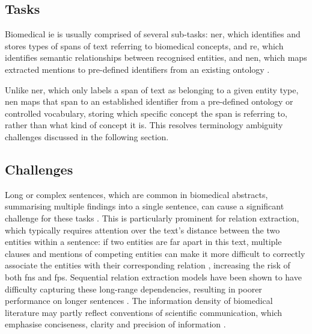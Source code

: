 \subsection{Tasks}
\label{subsec:lit:tasks}
Biomedical \gls{ie} is usually comprised of several sub-tasks: \gls{ner}, which identifies and stores types of spans of text referring to biomedical concepts, and \gls{re}, which identifies semantic relationships between recognised entities, and \gls{nen}, which maps extracted mentions to pre-defined identifiers from an existing ontology \cite{perera2020_ie_introduction, li2017cnn}.

Unlike \gls{ner}, which only labels a span of text as belonging to a given entity type, \gls{nen} maps that span to an established identifier from a pre-defined ontology or controlled vocabulary, storing which specific concept the span is referring to, rather than what kind of concept it is. This resolves terminology ambiguity challenges discussed in the following section.

\subsection{Challenges}
\label{subsec:lit:challenges}
Long or complex sentences, which are common in biomedical abstracts, summarising multiple findings into a single sentence, can cause a significant challenge for these tasks \cite{segura2011linguistic}. This is particularly prominent for relation extraction, which typically requires attention over the text's distance between the two entities within a sentence: if two entities are far apart in this text, multiple clauses and mentions of competing entities can make it more difficult to correctly associate the entities with their corresponding relation \cite{hu2024hierarchical}, increasing the risk of both \glspl{fn} and \glspl{fp}. Sequential relation extraction models have been shown to have difficulty capturing these long-range dependencies, resulting in poorer performance on longer sentences \cite{fei2021span}. The information density of biomedical literature may partly reflect conventions of scientific communication, which emphasise conciseness, clarity and precision of information \cite{flanagin2024aspects}.

